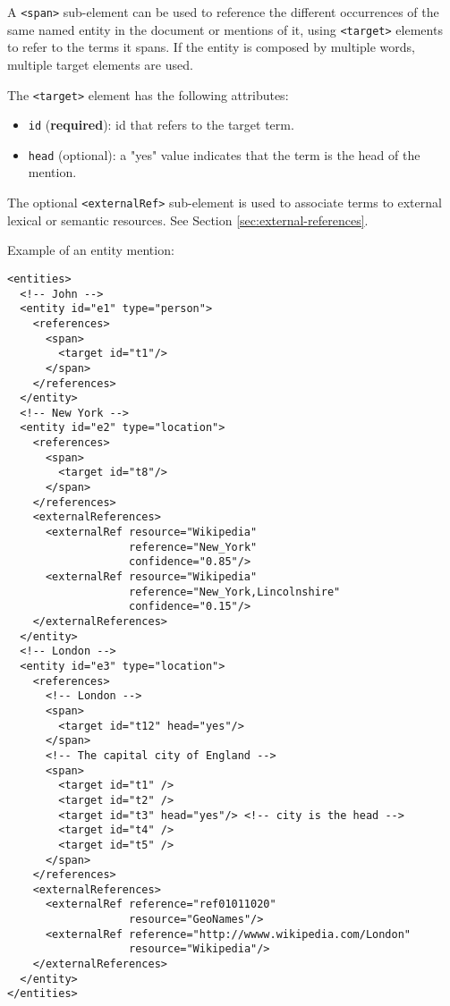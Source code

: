 A \texttt{<span>} sub-element can be used to reference the different
occurrences of the same named entity in the document or mentions of it,
using \texttt{<target>} elements to refer to the terms it spans. If the
entity is composed by multiple words, multiple target elements are used.

The \texttt{<target>} element has the following attributes:
\begin{itemize}
\item \texttt{id} (\textbf{required}): id that refers to the target term.
\item \texttt{head} (optional): a "yes" value indicates that the term is the
  head of the mention.
\end{itemize}

The optional \texttt{<externalRef>} sub-element is used to associate terms
to external lexical or semantic resources. See Section
\ref{sec:external-references}.

Example of an entity mention:

\begin{Verbatim}[fontsize=\small]
<entities>
  <!-- John -->
  <entity id="e1" type="person">
    <references>
      <span>
        <target id="t1"/>
      </span>
    </references>
  </entity>
  <!-- New York -->
  <entity id="e2" type="location">
    <references>
      <span>
        <target id="t8"/>
      </span>
    </references>
    <externalReferences>
      <externalRef resource="Wikipedia"
                   reference="New_York"
                   confidence="0.85"/>
      <externalRef resource="Wikipedia"
                   reference="New_York,Lincolnshire"
                   confidence="0.15"/>
    </externalReferences>
  </entity>
  <!-- London -->
  <entity id="e3" type="location">
    <references>
      <!-- London -->
      <span>
        <target id="t12" head="yes"/>
      </span>
      <!-- The capital city of England -->
      <span>
        <target id="t1" />
        <target id="t2" />
        <target id="t3" head="yes"/> <!-- city is the head -->
        <target id="t4" />
        <target id="t5" />
      </span>
    </references>
    <externalReferences>
      <externalRef reference="ref01011020" 
                   resource="GeoNames"/>
      <externalRef reference="http://wwww.wikipedia.com/London" 
                   resource="Wikipedia"/>
    </externalReferences>
  </entity>
</entities>
\end{Verbatim}


